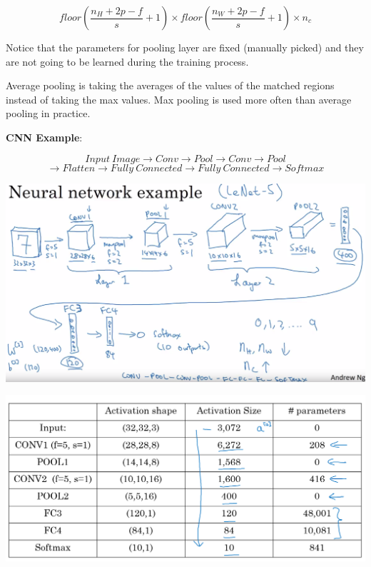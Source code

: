 \documentclass{article}
\begin{document}
\[floor(\frac{n_{H} + 2p - f}{s}  + 1) \times floor(\frac{n_{W} + 2p - f}{s} + 1) \times n_{c}\]

\noindent Notice that the parameters for pooling layer are fixed (manually picked) and they are not going to be learned during the training process.

\bigskip

\noindent Average pooling is taking the averages of the values of the matched regions instead of taking the max values. Max pooling is used more often than average pooling in practice.

\bigskip

\noindent \textbf{CNN Example}:

\[Input \ Image \longrightarrow Conv \longrightarrow Pool \longrightarrow Conv \longrightarrow Pool\]
\[\longrightarrow Flatten \longrightarrow Fully \ Connected \longrightarrow Fully \ Connected \longrightarrow Softmax\]

\begin{center}
\includegraphics[scale=0.2]{./images/cnn_example.png}
\end{center}
\begin{center}
\includegraphics[scale=0.3]{./images/cnn_example_table.png}
\end{center}
\end{document}
